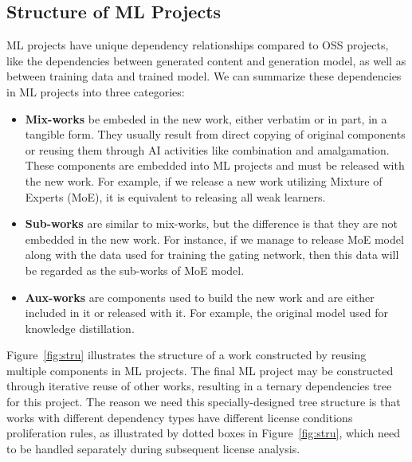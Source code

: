 \subsection{Structure of ML Projects}
ML projects have unique dependency relationships compared to OSS projects, like the dependencies between generated content and generation model, as well as between training data and trained model.
We can summarize these dependencies in ML projects into three categories:
\begin{itemize}[leftmargin=*]
    \item \textbf{Mix-works} be embeded in the new work, either verbatim or in part, in a tangible form.
    They usually result from direct copying of original components or reusing them through AI activities like combination and amalgamation. These components are embedded into ML projects and must be released with the new work. 
    For example, if we release a new work utilizing Mixture of Experts (MoE), it is equivalent to releasing all weak learners.

    \item \textbf{Sub-works} are similar to mix-works, but the difference is that they are not embedded in the new work. For instance, if we manage to release MoE model along with the data used for training the gating network, then this data will be regarded as the sub-works of MoE model.
    
    \item \textbf{Aux-works} are components used to build the new work and are either included in it or released with it. For example, the original model used for knowledge distillation.
\end{itemize}

Figure~\ref{fig:stru} illustrates the structure of a work constructed by reusing multiple components in ML projects.
The final ML project may be constructed through iterative reuse of other works, resulting in a ternary dependencies tree for this project.
The reason we need this specially-designed tree structure is that works with different dependency types have different license conditions proliferation rules, as illustrated by dotted boxes in Figure~\ref{fig:stru}, which need to be handled separately during subsequent license analysis. 


